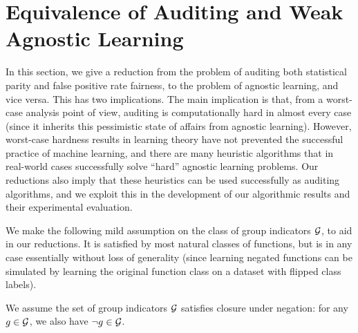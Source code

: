 \section{Equivalence of Auditing and Weak Agnostic Learning}
\label{sec:auditing}

In this section, we give a reduction from the problem of auditing both statistical parity and false positive rate fairness, to the problem of agnostic learning, and vice versa. This has two implications. The main implication is that, from a worst-case analysis point of view, auditing is computationally hard in almost every case (since it inherits this pessimistic state of affairs from agnostic learning).
However, worst-case hardness results in learning theory have not prevented the successful practice of machine learning,
and there are many heuristic algorithms that in real-world cases successfully solve ``hard'' agnostic learning problems. 
Our reductions also imply that these heuristics can be used successfully as auditing algorithms, and we exploit this in the
development of our algorithmic results and their experimental evaluation.


We make the following mild assumption on the class of group indicators $\mathcal{G}$, to aid in our reductions. It is satisfied by most natural classes of functions, but is in any case essentially without loss of generality (since learning negated functions can be simulated by learning the original function class on a dataset with flipped class labels).

\begin{assumpt}
  We assume the set of group indicators $\mathcal{G}$ satisfies closure under
  negation: for any $g\in \mathcal{G}$, we also have $\neg g\in \mathcal{G}$.

\end{assumpt}

